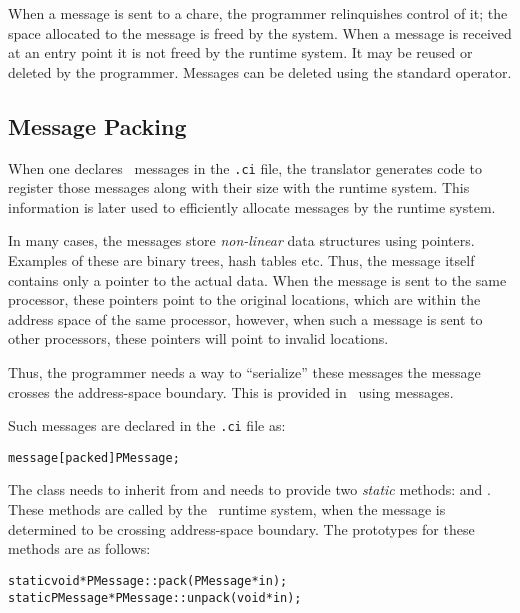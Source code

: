 When a message  is sent to a chare, the programmer
relinquishes control of it; the space allocated to the message is freed by the
system.  When a message is received at an entry point it is not freed by the
runtime system.  It may be reused or deleted by the programmer.  Messages can
be deleted using the standard \CC{}  operator.  


\subsection{Message Packing}
\label{message packing}

When one declares \charmpp\ messages in the \texttt{.ci} file, the translator
generates code to register those messages along with their size with the
runtime system. This information is later used to efficiently allocate messages
by the runtime system.

In many cases, the messages store {\em non-linear} data structures using
pointers.  Examples of these are binary trees, hash tables etc. Thus, the
message itself contains only a pointer to the actual data. When the message is
sent to the same processor, these pointers point to the original locations,
which are within the address space of the same processor, however, when such a
message is sent to other processors, these pointers will point to invalid
locations.

Thus, the programmer needs a way to ``serialize'' these messages
 the
message crosses the address-space boundary. This is provided in \charmpp\ using
 messages.

Such messages are declared in the {\tt .ci} file as:

\begin{alltt}
message [packed] PMessage;
\end{alltt}

The class  needs to inherit from  and needs
to provide two {\em static} methods:  and . These methods
are called by the \charmpp\ runtime system, when the message is determined to
be crossing address-space boundary. The prototypes for these methods are as
follows:

\begin{alltt}
static void *PMessage::pack(PMessage *in);
static PMessage *PMessage::unpack(void *in);
\end{alltt}

